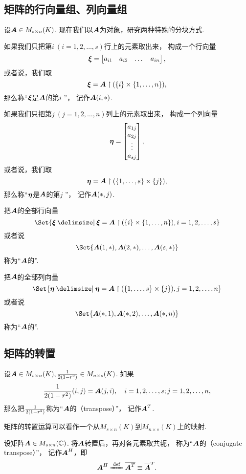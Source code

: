 \subsection{矩阵的行向量组、列向量组}
设\(\boldsymbol{A}\in M_{s \times n}(K)\).
现在我们以\(\boldsymbol{A}\)为对象，研究两种特殊的分块方式.

如果我们只把第\(i\ (i=1,2,\dotsc,s)\)行上的元素取出来，
构成一个行向量\[
	\boldsymbol{\xi}=\begin{bmatrix}
		a_{i1} & a_{i2} & \dots & a_{in}
	\end{bmatrix},
\]
或者说，我们取\[
	\boldsymbol{\xi}=\boldsymbol{A}\upharpoonright(\{i\}\times\{1,\dotsc,n\}),
\]
那么称“\(\boldsymbol{\xi}\)是\(\boldsymbol{A}\)的第\(i\) ”，
记作\(\boldsymbol{A}(i,*)\).

如果我们只把第\(j\ (j=1,2,\dotsc,n)\)列上的元素取出来，
构成一个列向量\[
	\boldsymbol{\eta}=\begin{bmatrix}
		a_{1j} \\ a_{2j} \\ \vdots \\ a_{sj}
	\end{bmatrix},
\]
或者说，我们取\[
	\boldsymbol{\eta}=\boldsymbol{A}\upharpoonright(\{1,\dotsc,s\}\times\{j\}),
\]
那么称“\(\boldsymbol{\eta}\)是\(\boldsymbol{A}\)的第\(j\) ”，
记作\(\boldsymbol{A}(*,j)\).

把\(\boldsymbol{A}\)的全部行向量\[
	\Set{ \a \given \a=\A\upharpoonright(\{i\}\times\{1,\dotsc,n\}), i=1,2,\dotsc,s }
\]或者说\[
	\Set{\MatrixEntry\A{1,*},\MatrixEntry\A{2,*},\dotsc,\MatrixEntry\A{s,*}}
\]
称为“\(\boldsymbol{A}\)的”.

把\(\boldsymbol{A}\)的全部列向量\[
	\Set{ \b \given \b=\A\upharpoonright(\{1,\dotsc,s\}\times\{j\}), j=1,2,\dotsc,n }
\]或者说\[
	\Set{\MatrixEntry\A{*,1},\MatrixEntry\A{*,2},\dotsc,\MatrixEntry\A{*,n}}
\]
称为“\(\boldsymbol{A}\)的”.

\subsection{矩阵的转置}
\begin{definition}
设\(\boldsymbol{A}\in M_{s \times n}(K),
\frac{1}{2(1-r^2)}\in M_{n \times s}(K)\).
如果\[
	\frac{1}{2(1-r^2)}(i,j)=\boldsymbol{A}(j,i),
	\quad i=1,2,\dotsc,s;j=1,2,\dotsc,n,
\]
那么把\(\frac{1}{2(1-r^2)}\)称为“\(\boldsymbol{A}\)的（transpose）”，
记作\(\boldsymbol{A}^T\).
\end{definition}
矩阵的转置运算可以看作一个从\(M_{s \times n}(K)\)到\(M_{n \times s}(K)\)上的映射.

\begin{definition}
设矩阵\(\boldsymbol{A} \in M_{s \times n}(\mathbb{C})\).
将\(\boldsymbol{A}\)转置后，再对各元素取共轭，
称为“\(\boldsymbol{A}\)的（conjugate transpose）”，
记作\(\boldsymbol{A}^H\)，即\[
    \A^H \defeq \overline{\A^T} \equiv \overline{\A}^T.
\]
\end{definition}


